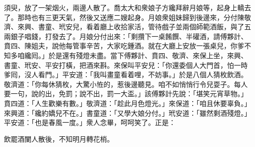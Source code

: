 須臾，放了一架烟火，兩邊人散了。喬太大和衆娘子方纔拜辭月娘等，起身上轎去了。那時也有三更天氣，然後又送應二嫂起身。月娘衆姐妹歸到後邊來，分付陳敬濟、來興、書童、玳安兒，看着廳上收拾家活，管待戲子並兩個師範酒飯，與了五兩銀子唱錢，打發去了。月娘分付出來：「剩攢下一桌餚饌、半礶酒，請傅夥計、賁四、陳姐夫，說他每管事辛苦，大家吃鍾酒。就在大廳上安放一張桌兒，你爹不知多咱纔囘。」於是還有殘燈未盡。當下傅夥計、賁四、敬濟、來保上坐，來興、書童、玳安、平安打橫，把酒來斟。來保叫平安兒：「你還委個人大門首，怕一時爹囘，沒人看門。」平安道：「我叫畫童看着哩，不妨事。」於是八個人猜枚飲酒。敬濟道：「你每休猜枚，大驚小恠的，惹後邊聽見。咱不如悄悄行令兒耍子。每人要一句，說的出，免罰；說不出，罰一大盃。」該傅夥計先說：「堪笑元宵草物。」賁四道：「人生歡樂有數。」敬濟道：「趁此月色燈光。」來保道：「咱且休要辜負。」來興道：「纔約嬌兒不在。」書童道：「又學大娘分付。」玳安道：「雖然剩酒殘燈。」平安道：「也是春風一度。」衆人念畢，呵呵笑了。正是：

\begin{myquote}
飲罷酒闌人散後，不知明月轉花梢。
\end{myquote}

